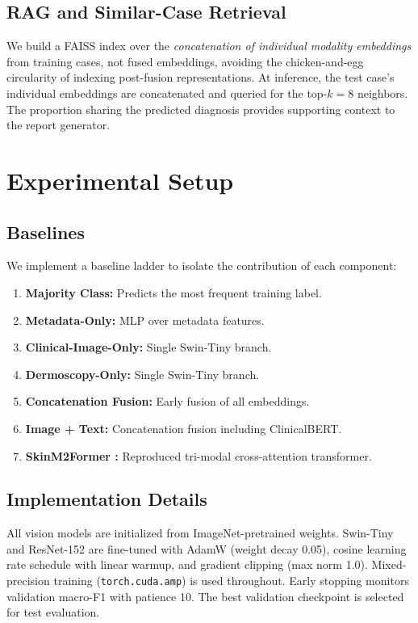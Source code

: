 \documentclass[conference]{IEEEtran}
\begin{document}
\subsection{RAG and Similar-Case Retrieval}

We build a FAISS index over the \textit{concatenation of individual modality embeddings} from training cases, not fused embeddings, avoiding the chicken-and-egg circularity of indexing post-fusion representations. At inference, the test case's individual embeddings are concatenated and queried for the top-$k=8$ neighbors. The proportion sharing the predicted diagnosis provides supporting context to the report generator.

\section{Experimental Setup}
\label{sec:experiments}

\subsection{Baselines}

We implement a baseline ladder to isolate the contribution of each component:
\begin{enumerate}
    \item \textbf{Majority Class:} Predicts the most frequent training label.
    \item \textbf{Metadata-Only:} MLP over metadata features.
    \item \textbf{Clinical-Image-Only:} Single Swin-Tiny branch.
    \item \textbf{Dermoscopy-Only:} Single Swin-Tiny branch.
    \item \textbf{Concatenation Fusion:} Early fusion of all embeddings.
    \item \textbf{Image + Text:} Concatenation fusion including ClinicalBERT.
    \item \textbf{SkinM2Former \cite{zhang2025}:} Reproduced tri-modal cross-attention transformer.
\end{enumerate}

\subsection{Implementation Details}

All vision models are initialized from ImageNet-pretrained weights. Swin-Tiny and ResNet-152 are fine-tuned with AdamW (weight decay 0.05), cosine learning rate schedule with linear warmup, and gradient clipping (max norm 1.0). Mixed-precision training (\texttt{torch.cuda.amp}) is used throughout. Early stopping monitors validation macro-F1 with patience 10. The best validation checkpoint is selected for test evaluation.
\end{document}
